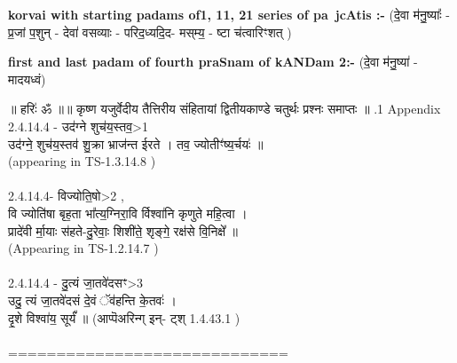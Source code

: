 \documentclass[17pt]{extarticle}
\begin{document}
        \textbf{korvai with starting padams of1, 11, 21 series of pa~jcAtis :-} \newline
        (दे॒वा म॑नु॒ष्याः᳚ - प्र॒जां प॒शुन् - देवा॑ वसव्याः - परिद॒ध्यदि॒द- मस्‌म्य॒ - ष्टा च॑त्वारिꣳशत् ) \newline

        \textbf{first and last padam of fourth praSnam of kANDam 2:-} \newline
        (दे॒वा म॑नु॒ष्या॑ - मादयध्वं) \newline 

        
        ॥ हरिः॑ ॐ ॥॥ कृष्ण यजुर्वेदीय तैत्तिरीय संहितायां द्वितीयकाण्डे चतुर्थः प्रश्नः समाप्तः ॥ \newline
        .1   Appendix\\2.4.14.4 - उद॑ग्ने शुच॑य॒स्तव॒>1\\उद॑ग्ने॒ शुच॑य॒स्तव॑ शु॒क्रा भ्राज॑न्त ईरते । तव॒ ज्योतीꣳ॑ष्य॒र्चयः॑ ॥ \\(appearing in TS-1.3.14.8 )\\\\2.4.14.4- विज्योति॒षो>2 ,\\वि ज्योति॑षा बृह॒ता भा᳚त्य॒ग्निरा॒वि र्विश्वा॑नि कृणुते महि॒त्वा ।\\प्रादे॑वी र्मा॒याः स॑हते-दु॒रेवाः॒ शिशी॑ते॒ शृङ्गे॒ रक्ष॑से वि॒निक्षे᳚ ॥\\(Appearing in TS-1.2.14.7 )\\\\2.4.14.4 - दु॒त्यं जा॒तवे॑दसꣳ>3\\उदु॒ त्यं जा॒तवे॑दसं दे॒वं ॅव॑हन्ति के॒तवः॑ । \\दृ॒शे विश्वा॑य॒ सूर्यं᳚ ॥ (आप्पॆअरिन्ग् इन्- ट्श् 1.4.43.1 )\\\\=============================\\
                \pagebreak
        
\end{document}
